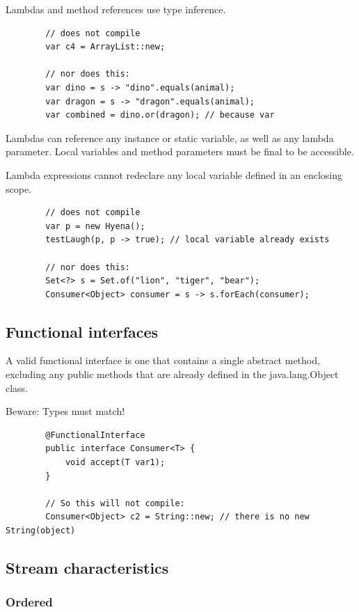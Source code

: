 \documentclass{scrartcl}
\begin{document}
    Lambdas and method references use type inference.

    \begin{lstlisting}
        // does not compile
        var c4 = ArrayList::new;

        // nor does this:
        var dino = s -> "dino".equals(animal);
        var dragon = s -> "dragon".equals(animal);
        var combined = dino.or(dragon); // because var
    \end{lstlisting}

    Lambdas can reference any instance or static variable, as well as any lambda parameter. Local variables and method parameters must be final to be accessible.



    Lambda expressions cannot redeclare any local variable defined in an enclosing scope.

    \begin{lstlisting}
        // does not compile
        var p = new Hyena();
        testLaugh(p, p -> true); // local variable already exists

        // nor does this:
        Set<?> s = Set.of("lion", "tiger", "bear");
        Consumer<Object> consumer = s -> s.forEach(consumer);
    \end{lstlisting}




\subsection{Functional interfaces}

    A valid functional interface is one that contains a single abstract method, excluding any public methods that are already defined in the java.lang.Object class.

    Beware: Types must match!

    \begin{lstlisting}
        @FunctionalInterface
        public interface Consumer<T> {
            void accept(T var1);
        }

        // So this will not compile:
        Consumer<Object> c2 = String::new; // there is no new String(object)
    \end{lstlisting}

\subsection{Stream characteristics}
\subsubsection{Ordered}
\end{document}

